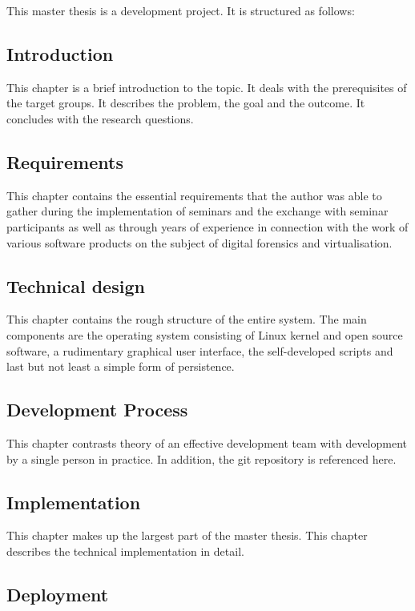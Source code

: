 This master thesis is a development project. It is structured as follows:

\subsection{Introduction}

This chapter is a brief introduction to the topic. It deals with the prerequisites of the target groups. It describes the problem, the goal and the outcome. It concludes with the research questions.

\subsection{Requirements}

This chapter contains the essential requirements that the author was able to gather during the implementation of seminars and the exchange with seminar participants as well as through years of experience in connection with the work of various software products on the subject of digital forensics and virtualisation.

\subsection{Technical design}

This chapter contains the rough structure of the entire system. The main components are the operating system consisting of Linux kernel and open source software, a rudimentary graphical user interface, the self-developed scripts and last but not least a simple form of persistence.

\subsection{Development Process}

This chapter contrasts theory of an effective development team with development by a single person in practice. In addition, the git repository is referenced here.

\subsection{Implementation}

This chapter makes up the largest part of the master thesis. This chapter describes the technical implementation in detail.

\subsection{Deployment}

